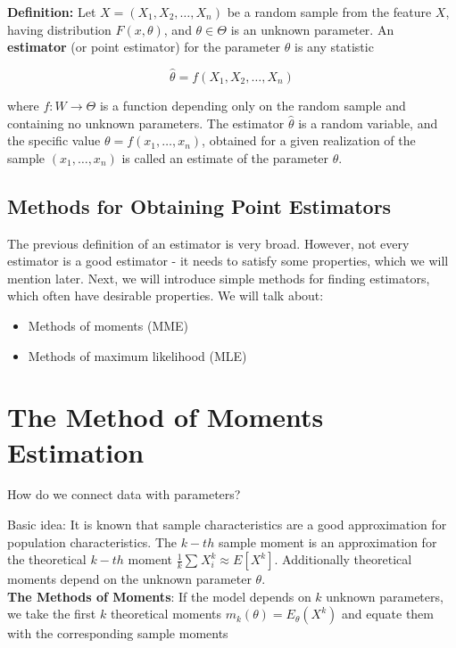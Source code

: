 \documentclass[a4paper, 12pt]{article}
\begin{document}
\textbf{Definition: } Let $X = (X_1, X_2, \dots, X_n)$ be a random sample from the feature $X$, having distribution $F(x, \theta)$, and $\theta \in \Theta$ is an unknown parameter. An \textbf{estimator} (or point estimator) for the parameter $\theta$ is any statistic

\[\hat{\theta} = f(X_1, X_2, \dots, X_n) \]

where $f: W \rightarrow \Theta$ is a function depending only on the random sample and containing no unknown parameters. The estimator $\hat{\theta}$ is a random variable, and the specific value $\theta = f(x_1, \dots, x_n)$, obtained for a given realization of the sample $(x_1, \dots, x_n)$ is called an estimate of the parameter $\theta$.

\subsection{Methods for Obtaining Point Estimators}

The previous definition of an estimator is very broad. However, not every estimator is a good estimator - it needs to satisfy some properties, which we will mention later. Next, we will introduce simple methods for finding estimators, which often have desirable properties. We will talk about:

\begin{itemize}
  \item Methods of moments (MME)
  \item Methods of maximum likelihood (MLE)
\end{itemize}

\section{The Method of Moments Estimation}

How do we connect data with parameters?

Basic idea: It is known that sample characteristics are a good approximation for
population characteristics. The $k-th$ sample moment is an approximation for the
theoretical $k-th$ moment $\frac{1}{k}\sum_{}^{}X_i^k \approx E[X^k]$. Additionally theoretical moments depend on the unknown parameter $\theta$.\\

\textbf{The Methods of Moments}: If the model depends on $k$ unknown parameters, we take the first $k$ theoretical moments $m_k(\theta)=E_\theta (X^k)$ and equate them with the corresponding sample moments
\end{document}

